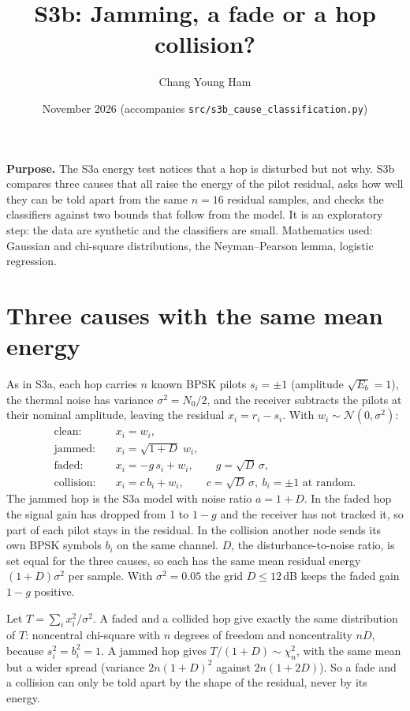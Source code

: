 \documentclass[11pt,a4paper]{article}
\title{S3b: Jamming, a fade or a hop collision?}
\author{Chang Young Ham}
\date{November 2026 \quad (accompanies \texttt{src/s3b\_cause\_classification.py})}
\begin{document}
\maketitle

\noindent\textbf{Purpose.}
The S3a energy test notices that a hop is disturbed but not why. S3b compares
three causes that all raise the energy of the pilot residual, asks how well
they can be told apart from the same $n = 16$ residual samples, and checks the
classifiers against two bounds that follow from the model. It is an
exploratory step: the data are synthetic and the classifiers are small.
Mathematics used: Gaussian and chi-square distributions, the Neyman--Pearson
lemma, logistic regression.

\section{Three causes with the same mean energy}

As in S3a, each hop carries $n$ known BPSK pilots $s_i = \pm 1$ (amplitude
$\sqrt{E_b} = 1$), the thermal noise has variance $\sigma^2 = N_0/2$, and the
receiver subtracts the pilots at their nominal amplitude, leaving the residual
$x_i = r_i - s_i$. With $w_i \sim \mathcal N(0, \sigma^2)$:
\begin{align*}
  \text{clean:}     &\quad x_i = w_i, \\
  \text{jammed:}    &\quad x_i = \sqrt{1 + D}\; w_i, \\
  \text{faded:}     &\quad x_i = -g\, s_i + w_i, \qquad g = \sqrt{D}\,\sigma, \\
  \text{collision:} &\quad x_i = c\, b_i + w_i,  \qquad c = \sqrt{D}\,\sigma,\ b_i = \pm 1 \text{ at random}.
\end{align*}
The jammed hop is the S3a model with noise ratio $a = 1 + D$. In the faded hop
the signal gain has dropped from 1 to $1 - g$ and the receiver has not tracked
it, so part of each pilot stays in the residual. In the collision another node
sends its own BPSK symbols $b_i$ on the same channel. $D$, the
disturbance-to-noise ratio, is set equal for the three causes, so each has the
same mean residual energy $(1 + D)\sigma^2$ per sample. With
$\sigma^2 = 0.05$ the grid $D \le 12$\,dB keeps the faded gain $1 - g$
positive.

Let $T = \sum_i x_i^2/\sigma^2$. A faded and a collided hop give exactly the
same distribution of $T$: noncentral chi-square with $n$ degrees of freedom and
noncentrality $nD$, because $s_i^2 = b_i^2 = 1$. A jammed hop gives
$T/(1+D) \sim \chi^2_n$, with the same mean but a wider spread (variance
$2n(1+D)^2$ against $2n(1+2D)$). So a fade and a collision can only be told
apart by the shape of the residual, never by its energy.
\end{document}
